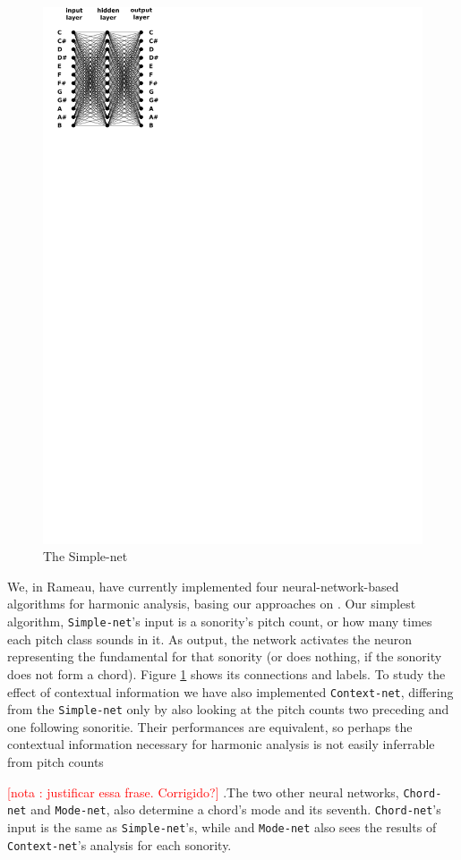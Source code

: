 \documentclass{article}
\newcounter{notacounter}
\newcommand{\nota}[1]{
  \addtocounter{notacounter}{1}
  \textcolor{red}{[nota \arabic{notacounter}: #1]}
}
\begin{document}
\begin{figure}
  \includegraphics[]{neural-networks}
  \caption{The Simple-net}
  \label{fig:simple-net-diagram}
\end{figure}


We, in Rameau, have currently implemented four neural-network-based
algorithms for harmonic analysis, basing our approaches on
\cite{tsui02:_harmon_analy_using_neural_networ}. Our simplest
algorithm, \texttt{Simple\hyp{}net}'s input is a sonority's pitch
count, or how many times each pitch class sounds in it. As output, the
network activates the neuron representing the fundamental for that
sonority (or does nothing, if the sonority does not form a
chord). Figure \ref{fig:simple-net-diagram} shows its connections and
labels. To study the effect of contextual information we have also
implemented \texttt{Context-net}, differing from the
\texttt{Simple-net} only by also looking at the pitch counts two
preceding and one following sonoritie. Their performances are
equivalent, so perhaps the contextual information necessary for
harmonic analysis is not easily inferrable from pitch counts
\nota{justificar essa frase. Corrigido?}.The two other neural
networks, \texttt{Chord-net} and \texttt{Mode-net}, also determine a
chord's mode and its seventh. \texttt{Chord-net}'s input is the same
as \texttt{Simple-net}'s, while and \texttt{Mode-net} also sees the
results of \texttt{Context-net}'s analysis for each sonority.
\end{document}
